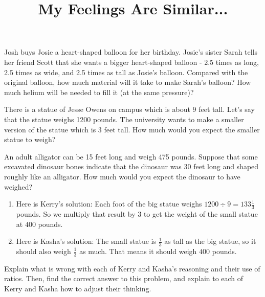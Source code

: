 \documentclass[nooutcomes, noauthor, handout]{ximera}
\begin{document}
\title{My Feelings Are Similar...}
\begin{abstract}
\end{abstract}
\maketitle



\begin{problem}
Josh buys Josie a heart-shaped balloon for her birthday.  Josie's sister Sarah tells her friend Scott that she wants a bigger heart-shaped balloon - 2.5 times as long, 2.5 times as wide, and 2.5 times as tall as Josie's balloon.  Compared with the original balloon, how much material will it take to make Sarah's balloon?  How much helium will be needed to fill it (at the same pressure)?

\end{problem}

\begin{problem}
There is a statue of Jesse Owens on campus which is about $9$ feet tall. Let's say that the statue weighs 1200 pounds. The university wants to make a smaller version of the statue which is $3$ feet tall. How much would you expect the smaller statue to weigh?



An adult alligator can be 15 feet long and weigh 475 pounds.  Suppose that some excavated dinosaur bones indicate that the dinosaur was 30 feet long and shaped roughly like an alligator.  How much would you expect the dinosaur to have weighed?
\begin{enumerate}
    \item Here is Kerry's solution: Each foot of the big statue weighs $1200 \div 9 = 133 \frac{1}{3}$ pounds.  So we multiply that result by $3$ to get the weight of the small statue at $400$ pounds.
    \item Here is Kasha's solution: The small statue is $\frac{1}{3}$ as tall as the big statue, so it should also weigh $\frac{1}{3}$ as much. That means it should weigh $400$ pounds.
\end{enumerate}

Explain what is wrong with each of Kerry and Kasha's reasoning and their use of ratios.  Then, find the correct answer to this problem, and explain to each of Kerry and Kasha how to adjust their thinking.
\end{problem}
\end{document}
